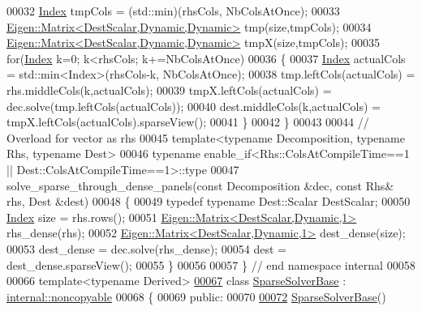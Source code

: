 \begin{DoxyCode}
00032   \hyperlink{namespace_eigen_a62e77e0933482dafde8fe197d9a2cfde}{Index} tmpCols = (std::min)(rhsCols, NbColsAtOnce); 
00033   \hyperlink{group___core___module_class_eigen_1_1_matrix}{Eigen::Matrix<DestScalar,Dynamic,Dynamic>} tmp(size,tmpCols);
00034   \hyperlink{group___core___module_class_eigen_1_1_matrix}{Eigen::Matrix<DestScalar,Dynamic,Dynamic>} tmpX(size,tmpCols);
00035   \textcolor{keywordflow}{for}(\hyperlink{namespace_eigen_a62e77e0933482dafde8fe197d9a2cfde}{Index} k=0; k<rhsCols; k+=NbColsAtOnce)
00036   \{
00037     \hyperlink{namespace_eigen_a62e77e0933482dafde8fe197d9a2cfde}{Index} actualCols = std::min<Index>(rhsCols-k, NbColsAtOnce);
00038     tmp.leftCols(actualCols) = rhs.middleCols(k,actualCols);
00039     tmpX.leftCols(actualCols) = dec.solve(tmp.leftCols(actualCols));
00040     dest.middleCols(k,actualCols) = tmpX.leftCols(actualCols).sparseView();
00041   \}
00042 \}
00043 
00044 \textcolor{comment}{// Overload for vector as rhs}
00045 \textcolor{keyword}{template}<\textcolor{keyword}{typename} Decomposition, \textcolor{keyword}{typename} Rhs, \textcolor{keyword}{typename} Dest>
00046 \textcolor{keyword}{typename} enable\_if<Rhs::ColsAtCompileTime==1 || Dest::ColsAtCompileTime==1>::type
00047 solve\_sparse\_through\_dense\_panels(\textcolor{keyword}{const} Decomposition &dec, \textcolor{keyword}{const} Rhs& rhs, Dest &dest)
00048 \{
00049   \textcolor{keyword}{typedef} \textcolor{keyword}{typename} Dest::Scalar DestScalar;
00050   \hyperlink{namespace_eigen_a62e77e0933482dafde8fe197d9a2cfde}{Index} size = rhs.rows();
00051   \hyperlink{group___core___module_class_eigen_1_1_matrix}{Eigen::Matrix<DestScalar,Dynamic,1>} rhs\_dense(rhs);
00052   \hyperlink{group___core___module_class_eigen_1_1_matrix}{Eigen::Matrix<DestScalar,Dynamic,1>} dest\_dense(size);
00053   dest\_dense = dec.solve(rhs\_dense);
00054   dest = dest\_dense.sparseView();
00055 \}
00056 
00057 \} \textcolor{comment}{// end namespace internal}
00058 
00066 \textcolor{keyword}{template}<\textcolor{keyword}{typename} Derived>
\hyperlink{group___sparse_core___module}{00067} \textcolor{keyword}{class }\hyperlink{group___sparse_core___module_class_eigen_1_1_sparse_solver_base}{SparseSolverBase} : \hyperlink{class_eigen_1_1internal_1_1noncopyable}{internal::noncopyable}
00068 \{
00069   \textcolor{keyword}{public}:
00070 
\hyperlink{group___sparse_core___module_aacd99fa17db475e74d3834767f392f33}{00072}     \hyperlink{group___sparse_core___module_aacd99fa17db475e74d3834767f392f33}{SparseSolverBase}()

\end{DoxyCode}
